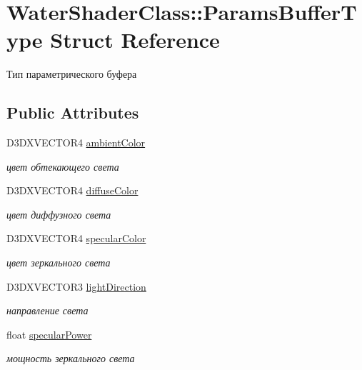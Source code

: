 \hypertarget{struct_water_shader_class_1_1_params_buffer_type}{}\section{Water\+Shader\+Class\+:\+:Params\+Buffer\+Type Struct Reference}
\label{struct_water_shader_class_1_1_params_buffer_type}


Тип параметрического буфера  


\subsection*{Public Attributes}
\begin{DoxyCompactItemize}
\item 
D3\+D\+X\+V\+E\+C\+T\+O\+R4 \hyperlink{struct_water_shader_class_1_1_params_buffer_type_a0ad650837dee212fd3af2aa4c221a0d5}{ambient\+Color}
\begin{DoxyCompactList}\small\item\em цвет обтекающего света \end{DoxyCompactList}\item 
D3\+D\+X\+V\+E\+C\+T\+O\+R4 \hyperlink{struct_water_shader_class_1_1_params_buffer_type_afdecaf6268d17aabd04a0bff88d5758c}{diffuse\+Color}
\begin{DoxyCompactList}\small\item\em цвет диффузного света \end{DoxyCompactList}\item 
D3\+D\+X\+V\+E\+C\+T\+O\+R4 \hyperlink{struct_water_shader_class_1_1_params_buffer_type_a504e95fdc345f96f9a8ba3fcfafbcde4}{specular\+Color}
\begin{DoxyCompactList}\small\item\em цвет зеркального света \end{DoxyCompactList}\item 
D3\+D\+X\+V\+E\+C\+T\+O\+R3 \hyperlink{struct_water_shader_class_1_1_params_buffer_type_a9bf23d712871511e3a5fa6d559c658ff}{light\+Direction}
\begin{DoxyCompactList}\small\item\em направление света \end{DoxyCompactList}\item 
float \hyperlink{struct_water_shader_class_1_1_params_buffer_type_a35049013108f864f3e60365627206c79}{specular\+Power}
\begin{DoxyCompactList}\small\item\em мощность зеркального света \end{DoxyCompactList}\item 

\end{DoxyCompactItemize}
